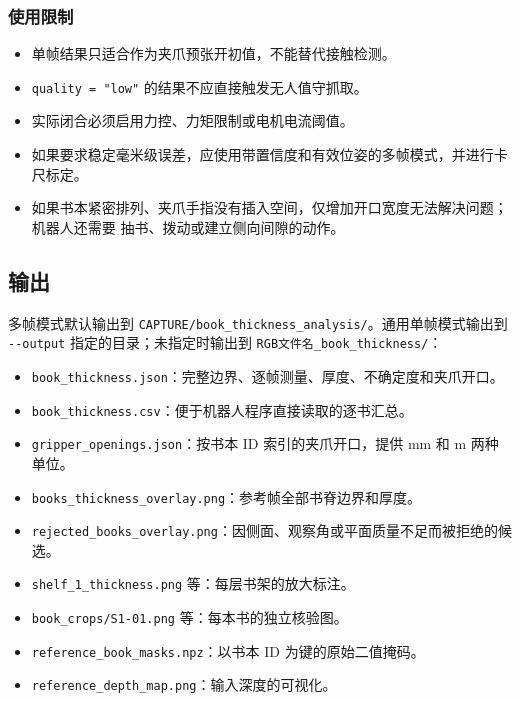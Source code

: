\documentclass[
  chinese,
  11pt,
  a4paper,
]{article}
\providecommand{\tightlist}{%
  \setlength{\itemsep}{0pt}\setlength{\parskip}{0pt}}
\begin{document}
\subsubsection{使用限制}\label{ux4f7fux7528ux9650ux5236}

\begin{itemize}
\tightlist
\item
  单帧结果只适合作为夹爪预张开初值，不能替代接触检测。
\item
  \texttt{quality\ =\ "low"} 的结果不应直接触发无人值守抓取。
\item
  实际闭合必须启用力控、力矩限制或电机电流阈值。
\item
  如果要求稳定毫米级误差，应使用带置信度和有效位姿的多帧模式，并进行卡尺标定。
\item
  如果书本紧密排列、夹爪手指没有插入空间，仅增加开口宽度无法解决问题；机器人还需要
  抽书、拨动或建立侧向间隙的动作。
\end{itemize}

\subsection{输出}\label{ux8f93ux51fa}

多帧模式默认输出到
\texttt{CAPTURE/book\_thickness\_analysis/}。通用单帧模式输出到
\texttt{-\/-output} 指定的目录；未指定时输出到
\texttt{RGB文件名\_book\_thickness/}：

\begin{itemize}
\tightlist
\item
  \texttt{book\_thickness.json}：完整边界、逐帧测量、厚度、不确定度和夹爪开口。
\item
  \texttt{book\_thickness.csv}：便于机器人程序直接读取的逐书汇总。
\item
  \texttt{gripper\_openings.json}：按书本 ID 索引的夹爪开口，提供 mm 和
  m 两种单位。
\item
  \texttt{books\_thickness\_overlay.png}：参考帧全部书脊边界和厚度。
\item
  \texttt{rejected\_books\_overlay.png}：因侧面、观察角或平面质量不足而被拒绝的候选。
\item
  \texttt{shelf\_1\_thickness.png} 等：每层书架的放大标注。
\item
  \texttt{book\_crops/S1-01.png} 等：每本书的独立核验图。
\item
  \texttt{reference\_book\_masks.npz}：以书本 ID 为键的原始二值掩码。
\item
  \texttt{reference\_depth\_map.png}：输入深度的可视化。
\end{itemize}
\end{document}
